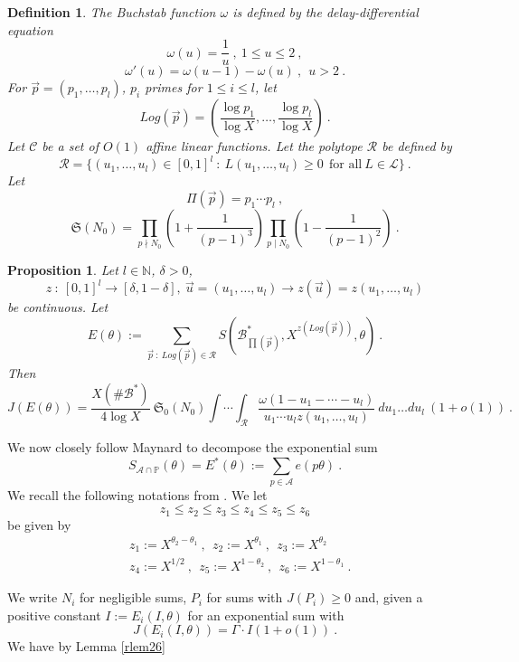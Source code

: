 \documentclass{amsart}
\newtheorem{proposition}[theorem]{Proposition}
\numberwithin{equation}{subsection}
\newtheorem{definition}[theorem]{Definition}
\begin{document}
\begin{definition}\label{def42}
The Buchstab function $\omega$ is defined by the delay-differential equation
$$\omega(u)=\frac{1}{u}\:,\ 1\leq u\leq 2\:,$$
$$\omega'(u)=\omega(u-1)-\omega(u)\:,\ \ u>2\:.$$
For $\vec{p}=(p_1,\ldots,p_l)$, $p_i$ primes for $1\leq i \leq l$, let
$$Log(\vec{p})=\left(\frac{\log p_1}{\log X},\ldots, \frac{\log p_l}{\log X}\right)\:.$$
Let $\mathcal{C}$ be a set of $O(1)$ affine linear functions. Let the polytope $\mathcal{R}$ be defined by
$$\mathcal{R}=\{(u_1, \ldots, u_l)\in[0,1]^l\::\: L(u_1,\ldots, u_l)\geq 0\ \ \text{for all}\ L\in\mathcal{L}\}\:.$$
Let 
$$\Pi(\vec{p})=p_1\cdots p_l\:,$$
$$\mathfrak{S}(N_0)=\prod_{p\nmid N_0}\left(1+\frac{1}{(p-1)^3}\right)\prod_{p\mid N_0}\left(1-\frac{1}{(p-1)^2}\right)\:.$$\end{definition}


\begin{proposition}\label{prop43}
Let $l\in\mathbb{N}$, $\delta>0$,
$$z\::\: [0,1]^l\rightarrow [\delta, 1-\delta],\ \vec{u}=(u_1,\ldots, u_l)\rightarrow z(\vec{u})=z(u_1, \ldots, u_l)$$
be continuous.
Let 
$$E(\theta):=\sum_{\vec{p}\::\: Log(\vec{p})\in \mathcal{R}} S(\mathcal{B}^*_{\prod(\vec{p})}, X^{z(Log(\vec{p}))}, \theta)\:.$$
Then 
$$J(E(\theta))=\frac{X(\#\mathcal{B}^*)}{4\log X}\: \mathfrak{S}_0(N_0) \int\cdots\int_\mathcal{R} \frac{\omega(1-u_1-\cdots - u_l)}{u_1\cdots u_l z(u_1, \ldots, u_l)}\: du_1\ldots du_l\: (1+o(1))\:.$$
\end{proposition}

We now closely follow Maynard \cite{maynard} to decompose the exponential sum
$$S_{\mathcal{A}\cap \mathbb{P}}(\theta)=E^*(\theta):=\sum_{p\in \mathcal{A}} e(p\theta)\:.$$
We recall the following notations from \cite{maynard}. We let
$$z_1\leq z_2 \leq z_3\leq z_4\leq z_5\leq z_6$$
be given by
\begin{align*}
&z_1:=X^{\theta_2-\theta_1}\:,\ \ z_2:=X^{\theta_1}\:,\ \ z_3:=X^{\theta_2}\\
&z_4:=X^{1/2}\:,\ \ z_5:=X^{1-\theta_2}\:,\ \ z_6:=X^{1-\theta_1}\:.
\end{align*}

We write $N_i$ for negligible sums, $P_i$ for sums with $J(P_i)\geq 0$ and, given a positive constant $I:=E_i(I,\theta)$ for an exponential sum with
$$J(E_i(I,\theta))=\Gamma\cdot I(1+o(1))\:.$$
We have by Lemma \ref{rlem26}
\end{document}
